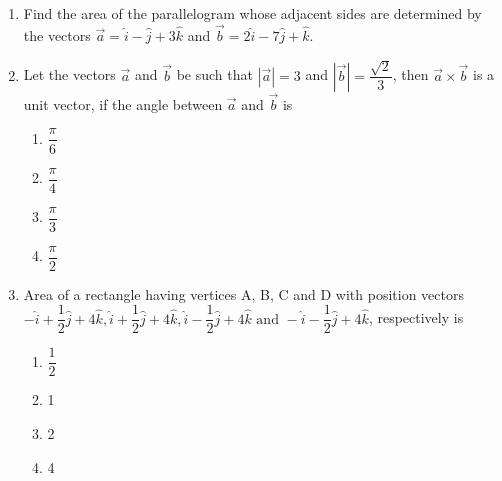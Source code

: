 \begin{enumerate}[label=\thesection.\arabic*,ref=\thesection.\theenumi]
	\\
		\solution
		
\item Find the area of the parallelogram whose adjacent sides are determined by the vectors $\overrightarrow{a}=\hat{i}-\hat{j}+3\hat{k}$ and $\overrightarrow{b}=2\hat{i}-7\hat{j}+\hat{k}$.
\item Let the vectors $\overrightarrow{a}$ and $\overrightarrow{b}$ be such that $|\overrightarrow{a}| = 3$ and $|\overrightarrow{b}| = \dfrac{\sqrt{2}}{3}$, then $\overrightarrow{a} \times \overrightarrow{b}$ is a unit vector, if the angle between $\overrightarrow{a}$ and $\overrightarrow{b}$ is
\begin{enumerate}
\item $\dfrac{\pi}{6}$
\item $\dfrac{\pi}{4}$
\item $\dfrac{\pi}{3}$
\item $\dfrac{\pi}{2}$
\end{enumerate}
\item Area of a rectangle having vertices A, B, C and D with position vectors $ -\hat{i}+ \dfrac{1}{2} \hat{j}+4\hat{k},\hat{i}+ \dfrac{1}{2} \hat{j}+4\hat{k},\hat{i}-\dfrac{1}{2} \hat{j}+4\hat{k}\text{ and }-\hat{i}- \dfrac{1}{2} \hat{j}+4\hat{k}$, respectively is
\begin{enumerate}
\item $\dfrac{1}{2}$
\item 1
\item 2
\item 4
\end{enumerate}
\end{enumerate}

